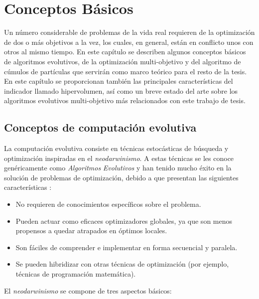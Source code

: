 \chapter{Conceptos B\'asicos}
  Un n\'umero considerable de problemas de la vida real requieren de la optimizaci\'on de dos o m\'as objetivos a la vez, 
  los cuales, en general, est\'an en conflicto unos con otros al mismo tiempo. En este cap\'itulo se describen algunos 
  conceptos b\'asicos de algoritmos evolutivos, de la optimizaci\'on multi-objetivo y del algoritmo de c\'umulos de 
  part\'iculas que servir\'an como marco te\'orico para el resto de la tesis. En este cap\'itulo se proporcionan tambi\'en 
  las principales caracter\'isticas del indicador llamado hipervolumen, as\'i como un breve estado 
  del arte sobre los algoritmos evolutivos multi-objetivo m\'as relacionados con este trabajo de tesis.

  \section{Conceptos de computaci\'on evolutiva}
  
  La computaci\'on evolutiva consiste en t\'ecnicas estoc\'asticas de b\'usqueda y optimizaci\'on inspiradas en el 
  \textit{neodarwinismo}. A estas t\'ecnicas se les conoce gen\'ericamente como \textit{Algoritmos} \textit{Evolutivos} 
  y han tenido mucho  \'exito en la soluci\'on de problemas de optimizaci\'on, debido a que presentan las siguientes 
  caracter\'isticas \cite{vicente06}:
  
  \begin{itemize}
  \item No requieren de conocimientos espec\'ificos sobre el problema.
  \item Pueden actuar como eficaces optimizadores globales, ya que son menos propensos a quedar atrapados en 
  \'optimos locales.
  \item Son f\'aciles de comprender e implementar en forma secuencial y paralela.
  \item Se pueden hibridizar con otras t\'ecnicas de optimizaci\'on (por ejemplo, t\'ecnicas de programaci\'on 
  matem\'atica).
  \end{itemize}

  El \textit{neodarwinismo} se compone de tres aspectos b\'asicos:
  

